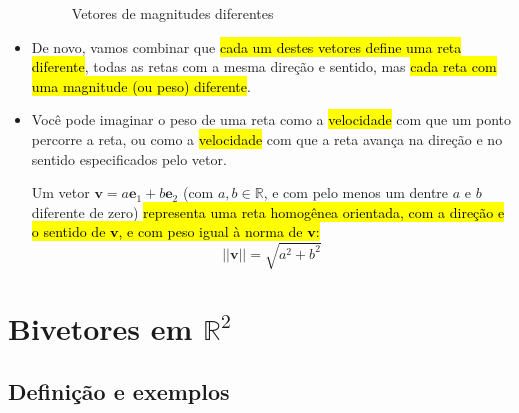 \documentclass[
  letterpaper,
  DIV=11,
  numbers=noendperiod]{scrreprt}
\begin{document}
\begin{itemize}
\begin{figure}[htb]
{  }

  \caption{\label{fig-vetores}Vetores de magnitudes diferentes}

  \end{figure}
\item
  De novo, vamos combinar que {\hl{cada um destes vetores define uma
  reta diferente}}, todas as retas com a mesma direção e sentido, mas
  {\hl{cada reta com uma magnitude (ou peso) diferente}}.
\item
  Você pode imaginar o peso de uma reta como a {\hl{velocidade}} com que
  um ponto percorre a reta, ou como a {\hl{velocidade}} com que a reta
  avança na direção e no sentido especificados pelo vetor.

  \begin{tcolorbox}[standard jigsaw,colframe=quarto-callout-note-color-frame, toptitle=1mm, colback=white, bottomtitle=1mm, coltitle=black, titlerule=0mm, opacitybacktitle=0.6, arc=.35mm, toprule=.15mm, opacityback=0, bottomrule=.15mm, rightrule=.15mm, colbacktitle=quarto-callout-note-color!10!white, leftrule=.75mm, title=\textcolor{quarto-callout-note-color}{\faInfo}\hspace{0.5em}{Resumindo: vetores \(=\) retas homogêneas orientadas e com peso}, left=2mm]
  Um vetor $\mathbf{v} = a\mathbf{e}_{1} + b\mathbf{e}_{2}$ (com
  $a, b \in \mathbb{R}$, e com pelo menos um dentre $a$ e $b$ diferente
  de zero) {\hl{representa uma reta homogênea orientada, com a direção e
  o sentido de $\mathbf{v}$, e com peso igual à norma de $\mathbf{v}$:}}
  \[
  ||\mathbf{v}|| = \sqrt{a^2 + b^2}
  \]
  \end{tcolorbox}
\end{itemize}

\hypertarget{bivetores-em-mathbbr2}{%
\section{\texorpdfstring{Bivetores em
$\mathbb{R}^2$}{Bivetores em }}\label{bivetores-em-mathbbr2}}

\hypertarget{definiuxe7uxe3o-e-exemplos}{%
\subsection{Definição e exemplos}\label{definiuxe7uxe3o-e-exemplos}}
\end{document}

